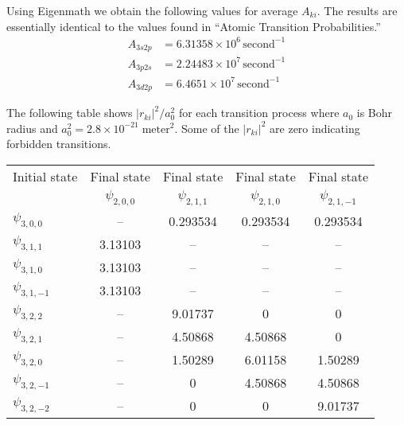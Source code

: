 \documentclass[12pt]{article}
\begin{document}
Using Eigenmath we obtain the following values for average $A_{ki}$.
The results are essentially identical to the values found in ``Atomic Transition Probabilities.''
\begin{align*}
A_{3s2p}&=6.31358\times10^6\,\text{second}^{-1}
\\
A_{3p2s}&=2.24483\times10^7\,\text{second}^{-1}
\\
A_{3d2p}&=6.4651\times10^7\,\text{second}^{-1}
\end{align*}

The following table shows $|r_{ki}|^2/a_0^2$ for each transition process
where $a_0$ is Bohr radius and $a_0^2=2.8\times10^{-21}\;\text{meter}^2$.
Some of the $|r_{ki}|^2$ are zero indicating forbidden transitions.

\begin{center}
\begin{tabular}{|l|c|c|c|c|}
\hline
Initial state & Final state & Final state & Final state & Final state
\\
& $\psi_{2,0,0}$ & $\psi_{2,1,1}$ & $\psi_{2,1,0}$ & $\psi_{2,1,-1}$
\\[1ex]
\hline
$\psi_{3,0,0}$ & -- & 0.293534 & 0.293534 & 0.293534
\\
\hline
$\psi_{3,1,1}$ & 3.13103 & -- & -- & --
\\
$\psi_{3,1,0}$ & 3.13103 & -- & -- & --
\\
$\psi_{3,1,-1}$ & 3.13103 & -- & -- & --
\\
\hline
$\psi_{3,2,2}$ & -- & 9.01737 & 0 & 0
\\
$\psi_{3,2,1}$ & -- & 4.50868 & 4.50868 & 0
\\
$\psi_{3,2,0}$ & -- & 1.50289 & 6.01158 & 1.50289
\\
$\psi_{3,2,-1}$ & -- & 0 & 4.50868 & 4.50868
\\
$\psi_{3,2,-2}$ & -- & 0 & 0 & 9.01737
\\
\hline
\end{tabular}
\end{center}
\end{document}
